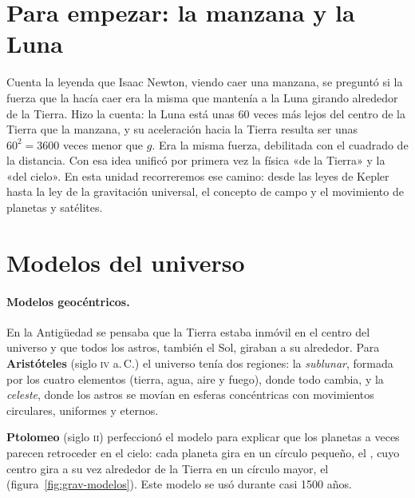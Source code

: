 
\section*{Para empezar: la manzana y la Luna}

Cuenta la leyenda que Isaac Newton, viendo caer una manzana, se preguntó si la fuerza que la hacía caer era la misma que
mantenía a la Luna girando alrededor de la Tierra. Hizo la cuenta: la Luna está unas 60 veces más lejos del centro de la
Tierra que la manzana, y su aceleración hacia la Tierra resulta ser unas \(60^2 = 3600\) veces menor que \(g\). Era la misma
fuerza, debilitada con el cuadrado de la distancia. Con esa idea unificó por primera vez la física «de la Tierra» y la «del
cielo». En esta unidad recorreremos ese camino: desde las leyes de Kepler hasta la ley de la gravitación universal, el
concepto de campo y el movimiento de planetas y satélites.

\section{Modelos del universo}\label{sec:grav-modelos}

\paragraph{Modelos geocéntricos.} En la Antigüedad se pensaba que la Tierra estaba inmóvil en el centro del universo y que
todos los astros, también el Sol, giraban a su alrededor. Para \textbf{Aristóteles} (siglo \textsc{iv} a.\,C.) el universo
tenía dos regiones: la \emph{sublunar}, formada por los cuatro elementos (tierra, agua, aire y fuego), donde todo cambia, y
la \emph{celeste}, donde los astros se movían en esferas concéntricas con movimientos circulares, uniformes y eternos.

\textbf{Ptolomeo} (siglo \textsc{ii}) perfeccionó el modelo para explicar que los planetas a veces parecen retroceder en el
cielo: cada planeta gira en un círculo pequeño, el , cuyo centro gira a su vez alrededor de la Tierra en un
círculo mayor, el  (figura~\ref{fig:grav-modelos}). Este modelo se usó durante casi 1500 años.

